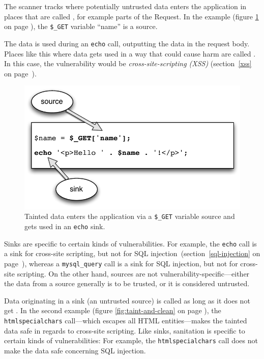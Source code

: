 The scanner tracks where potentially untrusted data enters the application in places that are called , for example parts of the Request. In the example (figure \ref{fig:taint} on page \pageref{fig:taint}), the \texttt{\$\_GET} variable ``name'' is a source.

The data is used during an \texttt{echo} call, outputting the data in the request body. Places like this where data gets used in a way that could cause harm are called . In this case, the vulnerability would be \emph{cross-site-scripting (XSS)} (section~\ref{xss} on page~\pageref{xss}).

\begin{figure}[htb]
  \begin{center}
    \includegraphics[scale=0.75]{images/taint}
    \caption{Tainted data enters the application via a \texttt{\$\_GET} variable source and gets used in an \texttt{echo} sink.}
    \label{fig:taint}
  \end{center}
\end{figure}

Sinks are specific to certain kinds of vulnerabilities. For example, the \texttt{echo} call is a sink for cross-site scripting, but not for SQL injection~(section~\ref{sql-injection} on page~\pageref{sql-injection}), whereas a \texttt{mysql\_query} call is a sink for SQL injection, but not for cross-site scripting. On the other hand, sources are not vulnerability-specific---either the data from a source generally is to be trusted, or it is considered untrusted.

Data originating in a sink (\ie an untrusted source) is called  as long as it does not get . In the second example (figure \ref{fig:taint-and-clean} on page \pageref{fig:taint-and-clean}), the \texttt{htmlspecialchars} call---which escapes all HTML entities---makes the tainted data safe in regards to cross-site scripting. Like sinks, sanitation is specific to certain kinds of vulnerabilities: For example, the \texttt{htmlspecialchars} call does not make the data safe concerning SQL injection.

